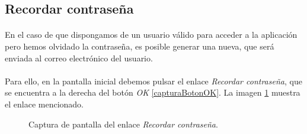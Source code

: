 \subsection{Recordar contraseña}

  \paragraph{}En el caso de que dispongamos de un usuario válido para acceder a
  la aplicación pero hemos olvidado la contraseña, es posible generar una nueva,
  que será enviada al correo electrónico del usuario.

  \paragraph{}Para ello, en la pantalla inicial debemos pulsar el enlace
  \textit{Recordar contraseña}, que se encuentra a la derecha del botón
  \textit{OK} \ref{capturaBotonOK}. La imagen \ref{capturaRecordarPassword}
  muestra el enlace mencionado.

  \begin{figure}[!ht]
    \begin{center}
      \caption{Captura de pantalla del enlace \textit{Recordar contraseña}.}
      \label{capturaRecordarPassword}
    \end{center}
  \end{figure}